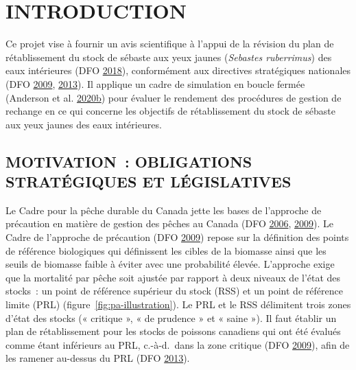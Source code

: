 \documentclass[11pt]{book}
\begin{document}
\frontmatter

\clearpage

\hypertarget{sec:introduction}{%
\section{INTRODUCTION}\label{sec:introduction}}

Ce projet vise à fournir un avis scientifique à l'appui de la révision du plan de rétablissement du stock de sébaste aux yeux jaunes (\emph{Sebastes ruberrimus}) des eaux intérieures (DFO \protect\hyperlink{ref-ifmp2018}{2018}), conformément aux directives stratégiques nationales (DFO \protect\hyperlink{ref-dfo2009}{2009}, \protect\hyperlink{ref-dfo2013}{2013}). Il applique un cadre de simulation en boucle fermée (Anderson et al. \protect\hyperlink{ref-anderson2020gfmp}{2020}\protect\hyperlink{ref-anderson2020gfmp}{b}) pour évaluer le rendement des procédures de gestion de rechange en ce qui concerne les objectifs de rétablissement du stock de sébaste aux yeux jaunes des eaux intérieures.

\hypertarget{sec:introduction-motivation}{%
\subsection{MOTIVATION~: OBLIGATIONS STRATÉGIQUES ET LÉGISLATIVES}\label{sec:introduction-motivation}}

Le Cadre pour la pêche durable du Canada jette les bases de l'approche de précaution en matière de gestion des pêches au Canada (DFO \protect\hyperlink{ref-dfo2006}{2006}, \protect\hyperlink{ref-dfo2009}{2009}). Le Cadre de l'approche de précaution (DFO \protect\hyperlink{ref-dfo2009}{2009}) repose sur la définition des points de référence biologiques qui définissent les cibles de la biomasse ainsi que les seuils de biomasse faible à éviter avec une probabilité élevée. L'approche exige que la mortalité par pêche soit ajustée par rapport à deux niveaux de l'état des stocks~: un point de référence supérieur du stock (RSS) et un point de référence limite (PRL) (figure~\ref{fig:pa-illustration}). Le PRL et le RSS délimitent trois zones d'état des stocks (« critique », « de prudence » et « saine »). Il faut établir un plan de rétablissement pour les stocks de poissons canadiens qui ont été évalués comme étant inférieurs au PRL, c.-à-d.~dans la zone critique (DFO \protect\hyperlink{ref-dfo2009}{2009}), afin de les ramener au-dessus du PRL (DFO \protect\hyperlink{ref-dfo2013}{2013}).
\end{document}
